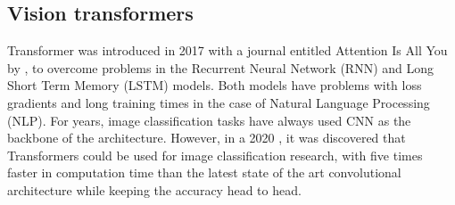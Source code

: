 \documentclass{article}
\begin{document}
\subsection{Vision transformers}\label{vision_transformers}
Transformer was introduced in 2017 with a journal entitled Attention Is All You by \cite{Vaswani2017}, to overcome problems in the Recurrent Neural Network (RNN) \citep{Hopfield1982rnn} and Long Short Term Memory (LSTM) \citep{hocreiter1997lstm} models. Both models have problems with loss gradients and long training times in the case of Natural Language Processing (NLP). For years, image classification tasks have always used CNN \citep{lecun1998cnn} as the backbone of the architecture. However, in a 2020 \cite{Dosovitskiy2020}, it was discovered that Transformers could be used for image classification research, with five times faster in computation time than the latest state of the art convolutional architecture while keeping the accuracy head to head.
\end{document}
